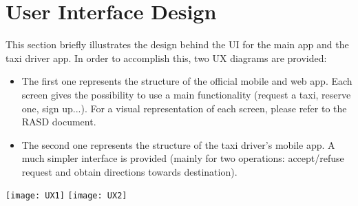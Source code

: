 \pagebreak
\section{User Interface Design}
This section briefly illustrates the design behind the UI for the main app and the taxi driver app. In order to accomplish this, two UX diagrams are provided:
\begin{itemize}
	\item The first one represents the structure of the official mobile and web app. Each screen gives the possibility to use a main functionality (request a taxi, reserve one, sign up...). For a visual representation of each screen, please refer to the RASD document.
	\item The second one represents the structure of the taxi driver's mobile app. A much simpler interface is provided (mainly for two operations: accept/refuse request and obtain directions towards destination). 
\end{itemize}

\texttt{[image: UX1]}
\texttt{[image: UX2]}